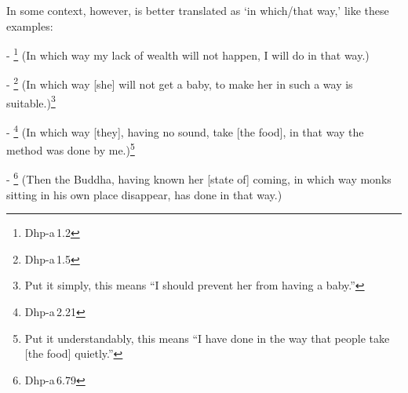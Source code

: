 \medskip
In some context, however,  is better translated as `in which/that way,' like these examples:\par
- \footnote{Dhp-a\,1.2} (In which way my lack of wealth will not happen, I will do in that way.)\par
- \footnote{Dhp-a\,1.5} (In which way [she] will not get a baby, to make her in such a way is suitable.)\footnote{Put it simply, this means ``I should prevent her from having a baby.''}\par
- \footnote{Dhp-a\,2.21} (In which way [they], having no sound, take [the food], in that way the method was done by me.)\footnote{Put it understandably, this means ``I have done in the way that people take [the food] quietly.''}\par
- \footnote{Dhp-a\,6.79} (Then the Buddha, having known her [state of] coming, in which way monks sitting in his own place disappear, has done in that way.)\par

